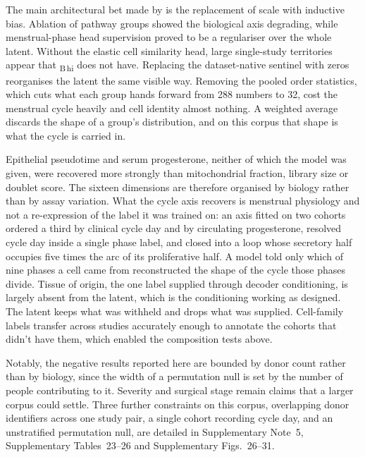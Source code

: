 The main architectural bet made by \elaj is the replacement of scale with
inductive bias. Ablation of pathway groups showed the biological axis
degrading, while menstrual-phase head supervision proved to be a regulariser
over the whole latent. Without the elastic cell similarity head, large
single-study territories appear that \elaj\textsubscript{B\,hi} does not
have. Replacing the dataset-native sentinel with zeros reorganises the latent
the same visible way. Removing the pooled order statistics,
which cuts what each group hands forward from 288 numbers to 32, cost the
menstrual cycle heavily and cell identity almost nothing. A weighted average
discards the shape of a group's distribution, and on this corpus that shape is
what the cycle is carried in.

Epithelial pseudotime and serum progesterone, neither of which the model was
given, were recovered more strongly than mitochondrial fraction, library size
or doublet score. The sixteen dimensions are therefore organised by biology
rather than by assay variation. What the cycle axis recovers is menstrual
physiology and not a re-expression of the label it was trained on: an axis
fitted on two cohorts ordered a third by clinical cycle day and by
circulating progesterone, resolved cycle day inside a single phase label,
and closed into a loop whose secretory half occupies five times the arc of
its proliferative half. A model told only which of nine phases a cell came
from reconstructed the shape of the cycle those phases divide.
Tissue of origin, the one label supplied through decoder conditioning, is
largely absent from the latent, which is the conditioning working as designed.
The latent keeps what was withheld and drops what was supplied. Cell-family
labels transfer across studies accurately enough to annotate the cohorts that
didn't have them, which enabled the composition tests above.

Notably, the negative results reported here are bounded by donor count rather 
than by biology, since the width of a permutation null is set by the number 
of people contributing to it. Severity and surgical stage remain claims that 
a larger corpus could settle. Three further constraints on this corpus, 
overlapping donor identifiers across one study pair, a single cohort 
recording cycle day, and an unstratified permutation null, are detailed 
in Supplementary Note~5, Supplementary Tables~23--26 and Supplementary
Figs.~26--31.

